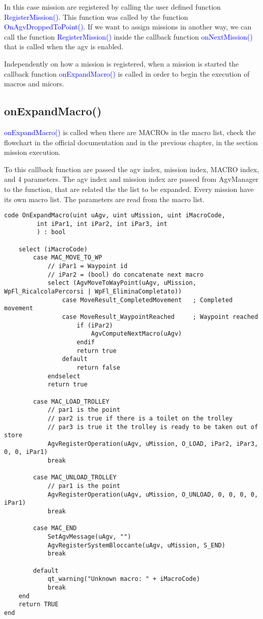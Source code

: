 In this case mission are registered by calling the user defined function \textcolor{blue}{RegisterMission()}. This function was called by the function \textcolor{blue}{OnAgvDroppedToPoint()}. If we want to assign missions in another way, we can call the function \textcolor{blue}{RegisterMission()} inside the callback function \textcolor{blue}{onNextMission()} that is called when the agv is enabled.

Independently on how a mission is registered, when a mission is started the callback function \textcolor{blue}{onExpandMacro()} is called in order to begin the execution of macros and micors.

%
\subsection*{onExpandMacro()}

\textcolor{blue}{onExpandMacro()} is called when there are MACROs in the macro list, check the flowchart in the official documentation and in the previous chapter, in the section mission execution.

To this callback function are passed the agv index, mission index, MACRO index, and 4 parameters. The agv index and mission index are passed from AgvManager to the function, that are related the the list to be expanded. Every mission have its own macro list. The parameters are read from the macro list.

\begin{lstlisting}[caption=onExpandMacro(), label=lstonExpandMacro]
code OnExpandMacro(uint uAgv, uint uMission, uint iMacroCode,
		 int iPar1, int iPar2, int iPar3, int
		 ) : bool
		 
	select (iMacroCode)
		case MAC_MOVE_TO_WP
			// iPar1 = Waypoint id
			// iPar2 = (bool) do concatenate next macro
			select (AgvMoveToWayPoint(uAgv, uMission, WpFl_RicalcolaPercorsi | WpFl_EliminaCompletato))
				case MoveResult_CompletedMovement	; Completed movement
				case MoveResult_WaypointReached		; Waypoint reached
					if (iPar2)
						AgvComputeNextMacro(uAgv)
					endif
					return true
				default
					return false
			endselect
			return true
		
		case MAC_LOAD_TROLLEY
			// par1 is the point
			// par2 is true if there is a toilet on the trolley
			// par3 is true it the trolley is ready to be taken out of store
			AgvRegisterOperation(uAgv, uMission, O_LOAD, iPar2, iPar3, 0, 0, iPar1)
			break
		
		case MAC_UNLOAD_TROLLEY
			// par1 is the point
			AgvRegisterOperation(uAgv, uMission, O_UNLOAD, 0, 0, 0, 0, iPar1)
			break
		
		case MAC_END
			SetAgvMessage(uAgv, "")
			AgvRegisterSystemBloccante(uAgv, uMission, S_END)
			break
		
		default
			qt_warning("Unknown macro: " + iMacroCode)
			break
	end
	return TRUE
end
\end{lstlisting}

